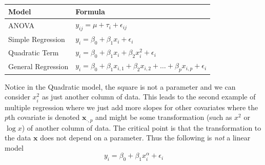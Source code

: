 \documentclass[]{book}
\theoremstyle{definition}
\theoremstyle{definition}
\theoremstyle{remark}
\begin{document}
\begin{longtable}[]{@{}ll@{}}
\toprule
\begin{minipage}[b]{0.25\columnwidth}\raggedright\strut
Model\strut
\end{minipage} & \begin{minipage}[b]{0.60\columnwidth}\raggedright\strut
Formula\strut
\end{minipage}\tabularnewline
\midrule
\endhead
\begin{minipage}[t]{0.25\columnwidth}\raggedright\strut
ANOVA\strut
\end{minipage} & \begin{minipage}[t]{0.60\columnwidth}\raggedright\strut
\(y_{ij}=\mu+\tau_{i}+\epsilon_{ij}\)\strut
\end{minipage}\tabularnewline
\begin{minipage}[t]{0.25\columnwidth}\raggedright\strut
Simple Regression\strut
\end{minipage} & \begin{minipage}[t]{0.60\columnwidth}\raggedright\strut
\(y_{i}=\beta_{0}+\beta_{1}x_{i}+\epsilon_{i}\)\strut
\end{minipage}\tabularnewline
\begin{minipage}[t]{0.25\columnwidth}\raggedright\strut
Quadratic Term\strut
\end{minipage} & \begin{minipage}[t]{0.60\columnwidth}\raggedright\strut
\(y_{i}=\beta_{0}+\beta_{1}x_{i}+\beta_{2}x_{i}^{2}+\epsilon_{i}\)\strut
\end{minipage}\tabularnewline
\begin{minipage}[t]{0.25\columnwidth}\raggedright\strut
General Regression\strut
\end{minipage} & \begin{minipage}[t]{0.60\columnwidth}\raggedright\strut
\(y_{i}=\beta_{0}+\beta_{1}x_{i,1}+\beta_{2}x_{i,2}+\dots+\beta_{p}x_{i,p}+\epsilon_{i}\)\strut
\end{minipage}\tabularnewline
\bottomrule
\end{longtable}

Notice in the Quadratic model, the square is not a parameter and we can
consider \(x_{i}^{2}\) as just another column of data. This leads to the
second example of multiple regression where we just add more slopes for
other covariates where the \(p\)th covariate is denoted
\(\boldsymbol{x}_{\cdot,p}\) and might be some transformation (such as
\(x^{2}\) or \(\log x\)) of another column of data. The critical point
is that the transformation to the data \(\boldsymbol{x}\) does not
depend on a parameter. Thus the following is \emph{not} a linear model
\[
y_{i}=\beta_{0}+\beta_{1}x_{i}^{\alpha}+\epsilon_{i}
\]
\end{document}

